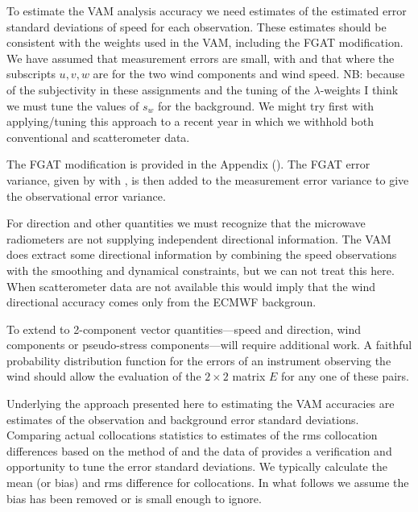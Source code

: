 \documentclass[12pt,titlepage]{article}
\begin{document}

To estimate the VAM analysis accuracy we need estimates of the
estimated error standard deviations of speed for each observation.
These estimates should be consistent with the weights used in the
VAM, including the FGAT modification.
We have assumed that measurement errors are small, with 
 and that  where the
subscripts $u, v, w$ are for the two wind components and wind speed.
NB: because of the subjectivity in these assignments and the tuning of
the $\lambda$-weights I think we must tune the values of $s_w$ for the
background.
We might try first with applying/tuning this approach to a recent year
in which we withhold both conventional and scatterometer data.

The FGAT modification is provided in the Appendix ().
The FGAT error variance, given by  with , is then
added to the measurement error variance to give the observational
error variance.

For direction and other quantities we must recognize that the
microwave radiometers are not supplying independent directional
information.
The VAM does extract some directional information by combining the
speed observations with the smoothing and dynamical constraints, but
we can not treat this here.
When scatterometer data are not available this would imply that the
wind directional accuracy comes only from the ECMWF backgroun.

To extend to 2-component vector quantities---speed and direction, wind components or
pseudo-stress components---will require additional work.
A faithful probability distribution function for the errors of an
instrument observing the wind should allow the evaluation of the
$2\times2$ matrix $E$ for any one of these pairs.


Underlying the approach presented here to estimating the VAM
accuracies are estimates of the observation and background error
standard deviations.
Comparing actual collocations statistics to estimates of the rms
collocation differences based on the method of  and the data of
 provides a verification and opportunity to tune the error
standard deviations.
We typically calculate the mean (or bias) and rms difference for
collocations.
In what follows we assume the bias has been removed or is small enough
to ignore.
\end{document}

